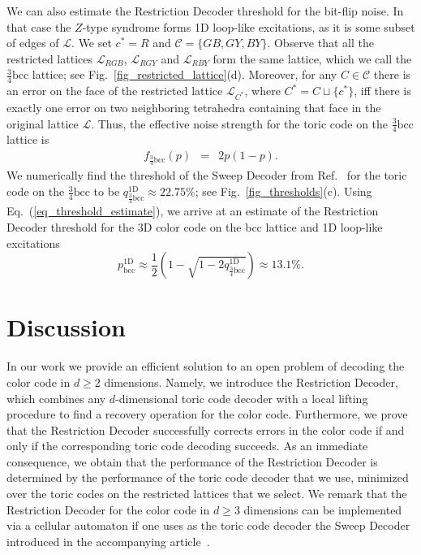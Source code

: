 \documentclass[onecolumn,letterpaper,11pt,accepted=2022-12-19]{quantumarticle}
\theoremstyle{definition}
\theoremstyle{lemma}
\theoremstyle{theorem}
\theoremstyle{corollary}
\begin{document}
{We can also estimate the Restriction Decoder threshold for the bit-flip noise.
In that case the $Z$-type syndrome forms 1D loop-like excitations, as it is some subset of edges of $\mathcal{L}$.
We set $c^* = R$ and $\mathcal{C} = \{ GB, GY, BY\}$.
Observe that all the restricted lattices $\mathcal{L}_{RGB}$, $\mathcal{L}_{RGY}$ and $\mathcal{L}_{RBY}$ form the same lattice, which we call the $\frac{3}{4}\textrm{bcc}$ lattice; see Fig.~\ref{fig_restricted_lattice}(d).
Moreover, for any $C\in\mathcal C$ there is an error on the face of the restricted lattice $\mathcal{L}_{C^*}$, where $C^* = C\sqcup\{c^*\}$, iff there is exactly one error on two neighboring tetrahedra containing that face in the original lattice $\mathcal{L}$.
Thus, the effective noise strength for the toric code on the $\frac{3}{4}\textrm{bcc}$ lattice is 
\begin{eqnarray}
f_{\frac{3}{4}\textrm{bcc}}(p) &=& 2p(1-p).
\end{eqnarray}
We numerically find the threshold of the Sweep Decoder from Ref.~\cite{Kubica2018toom} for the toric code on the $\frac{3}{4}\textrm{bcc}$ to be
$q^{\textrm{1D}}_{\frac{3}{4}\textrm{bcc}} \approx 22.75\%$; see Fig.~\ref{fig_thresholds}(c).
Using Eq.~(\ref{eq_threshold_estimate}), we arrive at an estimate of the Restriction Decoder threshold for the 3D color code on the bcc lattice and 1D loop-like excitations
\begin{equation}
p^{\textrm{1D}}_{\textrm{bcc}} \approx \frac{1}{2}\left(1 - \sqrt{1-2 q^{\textrm{1D}}_{\frac{3}{4}\textrm{bcc}}}\right)
\approx 13.1\%.
\end{equation}






\section{Discussion}


In our work we provide an efficient solution to an open problem of decoding the color code in $d\geq 2$ dimensions.
Namely, we introduce the Restriction Decoder, which combines any $d$-dimensional toric code decoder with a local lifting procedure to find a recovery operation for the color code.
Furthermore, we prove that the Restriction Decoder successfully corrects errors in the color code if and only if the corresponding toric code decoding succeeds.
As an immediate consequence, we obtain that the performance of the Restriction Decoder is determined by the performance of the toric code decoder that we use, minimized over the toric codes on the restricted lattices that we select.
We remark that the Restriction Decoder for the color code in $d\geq 3$ dimensions can be implemented via a cellular automaton if one uses as the toric code decoder the Sweep Decoder introduced in the accompanying article~\cite{Kubica2018toom}. 


}
\end{document}
